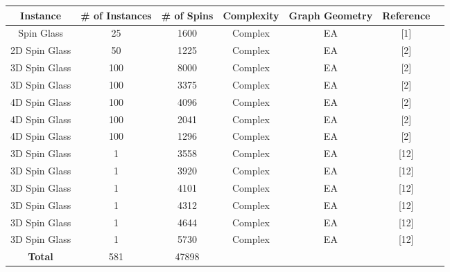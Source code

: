 \documentclass{standalone}
\begin{document}
\begin{tabular}{ |c|c|c|c|c|c|c| } 
    \hline
    \textbf{Instance} & \textbf{\# of Instances} & \textbf{\# of Spins} & \textbf{Complexity} & \textbf{Graph Geometry} & \textbf{Reference}\\ 
    \hline
    Spin Glass & 25 & 1600 & Complex & EA & [1] \\
    2D Spin Glass & 50 & 1225 & Complex & EA & [2] \\
    3D Spin Glass & 100 & 8000 & Complex & EA & [2] \\
    3D Spin Glass & 100 & 3375 & Complex & EA & [2] \\
    4D Spin Glass & 100 & 4096 & Complex & EA & [2] \\
    4D Spin Glass & 100 & 2041 & Complex & EA & [2] \\
    4D Spin Glass & 100 & 1296 & Complex & EA & [2] \\
    3D Spin Glass & 1 & 3558 & Complex & EA & [12] \\
    3D Spin Glass & 1 & 3920 & Complex & EA & [12] \\
    3D Spin Glass & 1 & 4101 & Complex & EA & [12] \\
    3D Spin Glass & 1 & 4312 & Complex & EA & [12] \\
    3D Spin Glass & 1 & 4644 & Complex & EA & [12] \\
    3D Spin Glass & 1 & 5730 & Complex & EA & [12] \\
     \hline
    \textbf{Total} & 581 & 47898 & & &\\
    \hline
\end{tabular}
\end{document}
